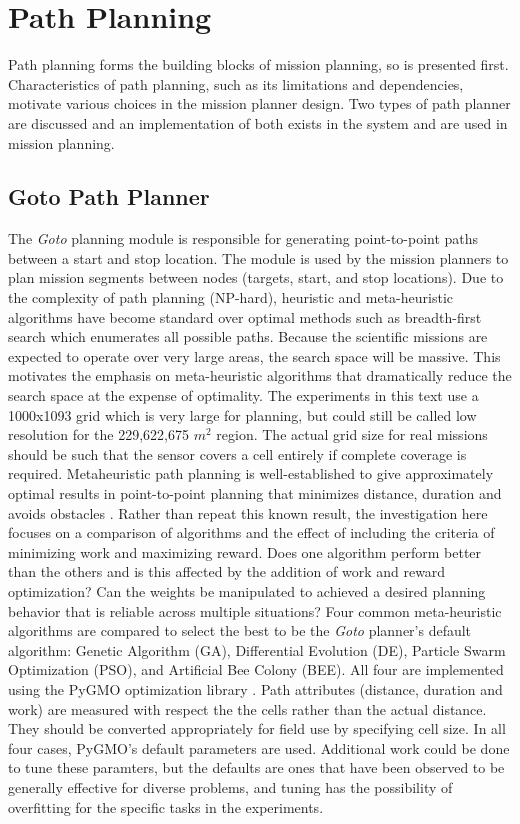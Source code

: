 \documentclass{tamuccthesis}
\begin{document}
\section{Path Planning}

Path planning forms the building blocks of mission planning, so is presented first. Characteristics of path planning, such as its limitations and dependencies, motivate various choices in the mission planner design. Two types of path planner are discussed and an implementation of both exists in the system and are used in mission planning.

\subsection{Goto Path Planner} \label{section:goto}

The \textit{Goto} planning module is responsible for generating point-to-point paths between a start and stop location. The module is used by the mission planners to plan mission segments between nodes (targets, start, and stop locations). Due to the complexity of path planning (NP-hard), heuristic and meta-heuristic algorithms have become standard over optimal methods such as breadth-first search which enumerates all possible paths. Because the scientific missions are expected to operate over very large areas, the search space will be massive. This motivates the emphasis on meta-heuristic algorithms that dramatically reduce the search space at the expense of optimality. The experiments in this text use a 1000x1093 grid which is very large for planning, but could still be called low resolution for the 229,622,675 $m^2$ region. The actual grid size for real missions should be such that the sensor covers a cell entirely if complete coverage is required. Metaheuristic path planning is well-established to give approximately optimal results in point-to-point planning that minimizes distance, duration and avoids obstacles \cite{hussein2012}. Rather than repeat this known result, the investigation here focuses on a comparison of algorithms and the effect of including the criteria of minimizing work and maximizing reward. Does one algorithm perform better than the others and is this affected by the addition of work and reward optimization? Can the weights be manipulated to achieved a desired planning behavior that is reliable across multiple situations? Four common meta-heuristic algorithms are compared to select the best to be the \textit{Goto} planner's default algorithm: Genetic Algorithm (GA), Differential Evolution (DE), Particle Swarm Optimization (PSO), and Artificial Bee Colony (BEE). All four are implemented using the PyGMO optimization library \cite{PyGMO}. Path attributes (distance, duration and work) are measured with respect the the cells rather than the actual distance. They should be converted appropriately for field use by specifying cell size. In all four cases, PyGMO's default parameters are used. Additional work could be done to tune these paramters, but the defaults are ones that have been observed to be generally effective for diverse problems, and tuning has the possibility of overfitting for the specific tasks in the experiments. 
\end{document}
